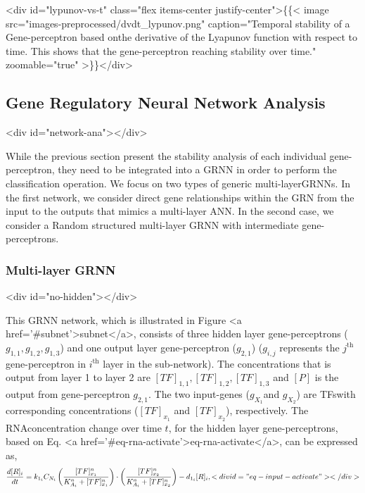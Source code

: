 \documentclass[twocolumn]{biophys-new}
\begin{document}
{{<div id="lypunov-vs-t" class="flex items-center justify-center">\{\{< image src="images-preprocessed/dvdt_lypunov.png" caption="Temporal stability of a Gene-perceptron based onthe derivative of the Lyapunov function with respect to time. This shows that the gene-perceptron reaching stability over time.\vspace{-1em}" zoomable="true" >\}\}</div>


\subsection{Gene Regulatory Neural Network Analysis} <div id="network-ana"></div>



While the previous section present the stability analysis of each individual gene-perceptron, they need to be integrated into a GRNN in order to perform the classification operation. We focus on two types of generic multi-layerGRNNs. In the first network, we consider direct gene relationships within the GRN from the input to the outputs that mimics a multi-layer ANN. In the second case, we consider a Random structured multi-layer GRNN with intermediate gene-perceptrons. 

\subsubsection*{Multi-layer GRNN} <div id="no-hidden"></div>

This GRNN network, which is illustrated in Figure <a href='#subnet'>subnet</a>, consists of three hidden layer gene-perceptrons ($g_{1,1}, g_{1,2}, g_{1,3}$) and one output layer gene-perceptron ($g_{2,1}$) ($g_{i,j}$ represents the $j^{\text{th}}$ gene-perceptron in $i^{\text{th}}$ layer in the sub-network). The concentrations that is output from layer 1 to layer 2 are $[TF]_{1,1}, [TF]_{1,2}, [TF]_{1,3}$ and $[P]$ is the output from gene-perceptron $g_{2,1}$.
The two input-genes ($g_{X_1} $and $g_{X_2}$) are TFswith corresponding concentrations ($[TF]_{x_1}$ and $[TF]_{x_2}$), respectively. The RNAconcentration change over time $t$, for the hidden layer gene-perceptrons, based on Eq. <a href='#eq-rna-activate'>eq-rna-activate</a>, can be expressed as,
\vspace{-0.4em}
\begin{gather}
\dfrac{d[R]_i}{dt} = k_{1_i} C_{N_i} \left( \dfrac{[TF]_{x_1}^n}{K_{A_i}^n+ [TF]_{x_1}^n} \right) 
\cdot \left( \dfrac{[TF]_{x_2}^n}{K_{A_i}^n+ [TF]_{x_2}^n} \right) - d_{1_i} [R]_i, <div id="eq-input-activate"></div>
 

\end{gather}}}
\end{document}
